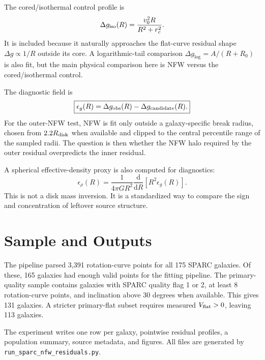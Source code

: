 \documentclass[10pt]{article}
\newcommand{\dd}{\mathrm{d}}
\begin{document}
The cored/isothermal control profile is
\begin{equation}
\Delta g_{\rm iso}(R)
=
\frac{v_0^2 R}{R^2+r_c^2}.
\end{equation}
It is included because it naturally approaches the flat-curve residual shape
$\Delta g\propto 1/R$ outside its core. A logarithmic-tail comparison
$\Delta g_{\log}=A/(R+R_0)$ is also fit, but the main physical comparison here
is NFW versus the cored/isothermal control.

The diagnostic field is
\begin{equation}
\boxed{
\epsilon_g(R)
=
\Delta g_{\rm obs}(R)
-
\Delta g_{\rm candidate}(R).
}
\end{equation}
For the outer-NFW test, NFW is fit only outside a galaxy-specific break radius,
chosen from $2.2R_{\rm disk}$ when available and clipped to the central
percentile range of the sampled radii. The question is then whether the NFW
halo required by the outer residual overpredicts the inner residual.

A spherical effective-density proxy is also computed for diagnostics:
\begin{equation}
\epsilon_\rho(R)
=
\frac{1}{4\pi G R^2}
\frac{\dd}{\dd R}
\left[
R^2\epsilon_g(R)
\right].
\end{equation}
This is not a disk mass inversion. It is a standardized way to compare the
sign and concentration of leftover source structure.

\section{Sample and Outputs}

The pipeline parsed 3,391 rotation-curve points for all 175 SPARC galaxies. Of
these, 165 galaxies had enough valid points for the fitting pipeline. The
primary-quality sample contains galaxies with SPARC quality flag 1 or 2, at
least 8 rotation-curve points, and inclination above 30 degrees when available.
This gives 131 galaxies. A stricter primary-flat subset requires measured
$V_{\rm flat}>0$, leaving 113 galaxies.

The experiment writes one row per galaxy, pointwise residual profiles, a
population summary, source metadata, and figures. All files are generated by
\texttt{run\_sparc\_nfw\_residuals.py}.
\end{document}
